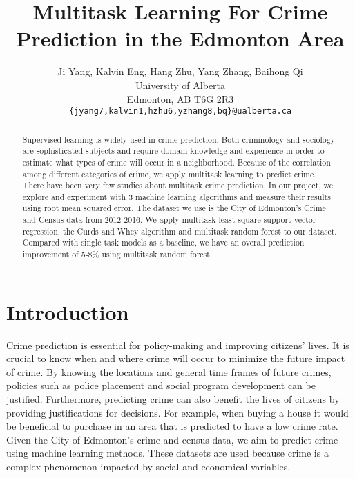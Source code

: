 \documentclass{article}
\title{Multitask Learning For Crime Prediction in the Edmonton Area}
\author{
  Ji Yang, Kalvin Eng, Hang Zhu, Yang Zhang, Baihong Qi\\
  University of Alberta\\
  Edmonton, AB T6G 2R3\\
  \texttt{\{jyang7,kalvin1,hzhu6,yzhang8,bq\}@ualberta.ca} \\
}
\begin{document}

\maketitle

\begin{abstract}
Supervised learning is widely used in crime prediction. Both criminology and sociology are sophisticated subjects and require domain knowledge and experience in order to estimate what types of crime will occur in a neighborhood. Because of the correlation among different categories of crime, we apply multitask learning to predict crime. There have been very few studies about multitask crime prediction. In our project, we explore and experiment with 3 machine learning algorithms and measure their results using root mean squared error. The dataset we use is the City of Edmonton's Crime and Census data from 2012-2016. We apply multitask least square support vector regression, the Curds and Whey algorithm and multitask random forest to our dataset. Compared with single task models as a baseline, we have an overall prediction improvement of 5-8\% using multitask random forest.
\end{abstract}

\section{Introduction}
Crime prediction is essential for policy-making and improving citizens’ lives. It is crucial to know when and where crime will occur to minimize the future impact of crime. By knowing the locations and general time frames of future crimes, policies such as police placement and social program development can be justified. Furthermore, predicting crime can also benefit the lives of citizens by providing justifications for decisions. For example, when buying a house it would be beneficial to purchase in an area that is predicted to have a low crime rate.
Given the City of Edmonton’s crime and census data, we aim to predict crime using machine learning methods. These datasets are used because crime is a complex phenomenon impacted by social and economical variables.
\end{document}
